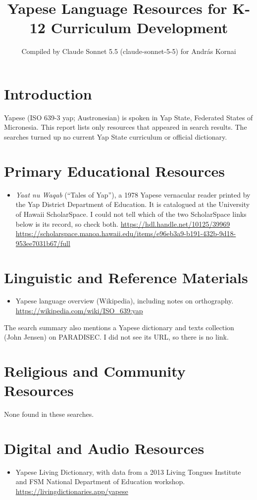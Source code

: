 \documentclass[12pt]{article}
\title{Yapese Language Resources for K-12 Curriculum Development}
\author{Compiled by Claude Sonnet 5.5 (claude-sonnet-5-5) for Andr\'as Kornai}
\date{}
\begin{document}
\maketitle

\section{Introduction}
Yapese (ISO 639-3 yap; Austronesian) is spoken in Yap State, Federated States of Micronesia. This report lists only resources that appeared in search results. The searches turned up no current Yap State curriculum or official dictionary.

\section{Primary Educational Resources}
\begin{itemize}
\item \emph{Yaat nu Waqab} (``Tales of Yap''), a 1978 Yapese vernacular reader printed by the Yap District Department of Education. It is catalogued at the University of Hawai\textquotesingle i ScholarSpace. I could not tell which of the two ScholarSpace links below is its record, so check both.
\url{https://hdl.handle.net/10125/39969}
\url{https://scholarspace.manoa.hawaii.edu/items/e96eb3a9-b191-432b-9d18-953ee7031b67/full}
\end{itemize}

\section{Linguistic and Reference Materials}
\begin{itemize}
\item Yapese language overview (Wikipedia), including notes on orthography. \url{https://wikipedia.com/wiki/ISO_639:yap}
\end{itemize}
The search summary also mentions a Yapese dictionary and texts collection (John Jensen) on PARADISEC. I did not see its URL, so there is no link.

\section{Religious and Community Resources}
None found in these searches.

\section{Digital and Audio Resources}
\begin{itemize}
\item Yapese Living Dictionary, with data from a 2013 Living Tongues Institute and FSM National Department of Education workshop. \url{https://livingdictionaries.app/yapese}
\end{itemize}
\end{document}
